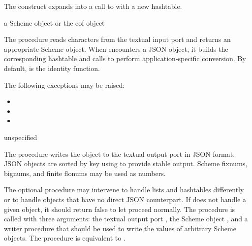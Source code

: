 \begin{syntax}
\end{syntax}

The  construct expands into a call to
 with a new hashtable.

\begin{procedure}
\end{procedure}
\returns{} a Scheme object or the eof object

The  procedure reads characters from the textual
input port  and returns an appropriate Scheme object.
When  encounters a JSON object, it builds
the corresponding hashtable and calls 
to perform application-specific conversion.
By default,  is the identity function.

The following exceptions may be raised:
\begin{itemize}
\item {}
\item {}
\item {}
\end{itemize}

\begin{procedure}
\end{procedure}
\returns{} unspecified

The  procedure writes the object  to the
textual output port  in JSON format. JSON objects are sorted
by key using  to provide stable output. Scheme fixnums,
bignums, and finite flonums may be used as numbers.

The optional  procedure may intervene to handle
lists and hashtables differently or to handle objects that have no
direct JSON counterpart.
If  does not handle a given object, it should
return false to let  proceed normally.
The  procedure is called with three arguments:
the textual output port , the Scheme object , and
a writer procedure  that should be used to write the values
of arbitrary Scheme objects.
The  procedure is equivalent to
.

